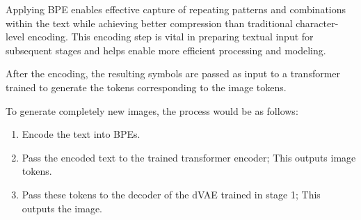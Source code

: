 Applying \ac{BPE} enables effective capture of repeating patterns and combinations within the text while achieving better compression than traditional character-level encoding. This encoding step is vital in preparing textual input for subsequent stages and helps enable more efficient processing and modeling.

After the encoding, the resulting symbols are passed as input to a transformer trained to generate the tokens corresponding to the image tokens.

To generate completely new images, the process would be as follows:

\begin{enumerate}
	\item Encode the text into \acp{BPE}.
	\item Pass the encoded text to the trained transformer encoder; This outputs image tokens.
	\item Pass these tokens to the decoder of the \ac{dVAE} trained in stage 1; This outputs the image.
\end{enumerate}